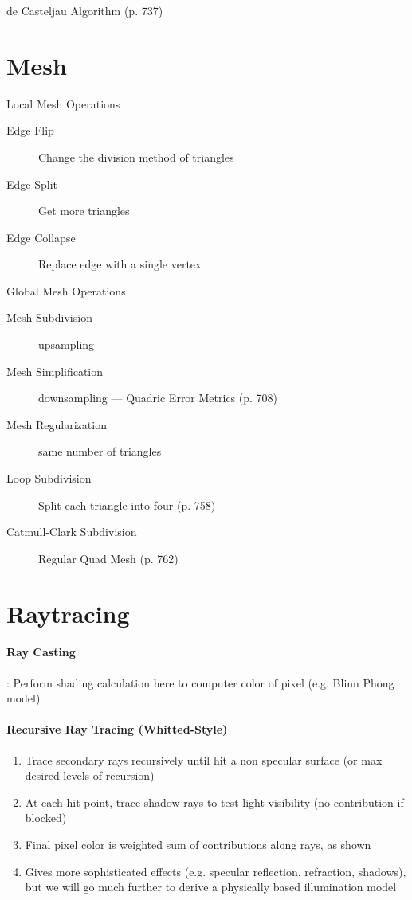 \documentclass[10pt,a4paper]{article}
\begin{document}
\begin{multicols}{3}
		de Casteljau Algorithm (p. 737)

		\section{Mesh}

		Local Mesh Operations
		\begin{description}
			\item[Edge Flip] Change the division method of triangles
			\item[Edge Split] Get more triangles
			\item[Edge Collapse] Replace edge with a single vertex
		\end{description}

		Global Mesh Operations
		\begin{description}
			\item[Mesh Subdivision] upsampling
			\item[Mesh Simplification] downsampling --- Quadric Error Metrics (p. 708)
			\item[Mesh Regularization] same number of triangles 
			\item[Loop Subdivision]  Split each triangle into four (p. 758)
			\item[Catmull-Clark Subdivision] Regular Quad Mesh (p. 762)
		\end{description}

		\section{Raytracing}

	 	\paragraph{Ray Casting}: Perform
		shading calculation
		here to computer color of pixel
		(e.g. Blinn Phong model)

		\paragraph{Recursive Ray Tracing (Whitted-Style)}
		\begin{enumerate}
			\item Trace secondary rays
			recursively until hit a non
			specular surface (or max
			desired levels of recursion)
			\item At each hit point, trace shadow
			rays to test light visibility (no
			contribution if blocked)
			\item Final pixel color is weighted
			sum of contributions along rays,
			as shown
			\item Gives more sophisticated
			effects (e.g. specular reflection,
			refraction, shadows), but we
			will go much
			further to derive a physically
			based illumination model
		\end{enumerate}


\end{multicols}
\end{document}
